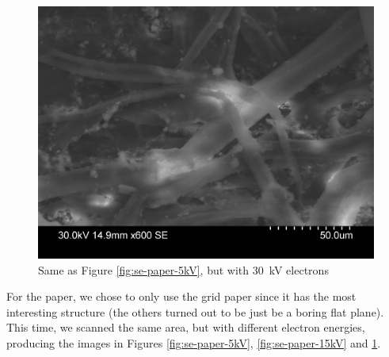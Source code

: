 \documentclass[a4paper]{scrartcl}
\begin{document}
\begin{figure}
    \centering
    \includegraphics[width = 15cm]{measurements/SE-paper-30kV.png}
    \caption{Same as Figure \ref{fig:se-paper-5kV}, but with \SI{30}{\kilo\volt} electrons}
    \label{fig:se-paper-30kV}
\end{figure}

For the paper, we chose to only use the grid paper since it has the most interesting structure (the others turned out to be just be a boring flat plane). This time, we scanned the same area, but with different electron energies, producing the images in Figures \ref{fig:se-paper-5kV}, \ref{fig:se-paper-15kV} and \ref{fig:se-paper-30kV}.
\end{document}
